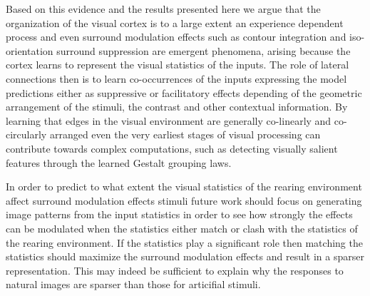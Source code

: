 Based on this evidence and the results presented here we argue that
the organization of the visual cortex is to a large extent an
experience dependent process and even surround modulation effects such
as contour integration and iso-orientation surround suppression are
emergent phenomena, arising because the cortex learns to represent the
visual statistics of the inputs. The role of lateral connections then
is to learn co-occurrences of the inputs expressing the model
predictions either as suppressive or facilitatory effects depending of
the geometric arrangement of the stimuli, the contrast and other
contextual information. By learning that edges in the visual
environment are generally co-linearly and co-circularly arranged even
the very earliest stages of visual processing can contribute towards
complex computations, such as detecting visually salient features
through the learned Gestalt grouping laws.

In order to predict to what extent the visual statistics of the
rearing environment affect surround modulation effects stimuli future
work should focus on generating image patterns from the input
statistics in order to see how strongly the effects can be modulated
when the statistics either match or clash with the statistics of the
rearing environment. If the statistics play a significant role then
matching the statistics should maximize the surround modulation
effects and result in a sparser representation. This may indeed be
sufficient to explain why the responses to natural images are sparser
than those for articifial stimuli.


